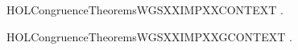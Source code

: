 \newcommand{\HOLCongruenceTheoremsWGSXXcases}{\UseVerbatim{HOLCongruenceTheoremsWGSXXcases}}
\begin{SaveVerbatim}{HOLCongruenceTheoremsWGSXXIMPXXCONTEXT}
\HOLTokenTurnstile{} \HOLSymConst{\HOLTokenForall{}}.   \HOLSymConst{\HOLTokenImp{}}  
\end{SaveVerbatim}
\newcommand{\HOLCongruenceTheoremsWGSXXIMPXXCONTEXT}{\UseVerbatim{HOLCongruenceTheoremsWGSXXIMPXXCONTEXT}}
\begin{SaveVerbatim}{HOLCongruenceTheoremsWGSXXIMPXXGCONTEXT}
\HOLTokenTurnstile{} \HOLSymConst{\HOLTokenForall{}}.   \HOLSymConst{\HOLTokenImp{}}  
\end{SaveVerbatim}
\newcommand{\HOLCongruenceTheoremsWGSXXIMPXXGCONTEXT}{\UseVerbatim{HOLCongruenceTheoremsWGSXXIMPXXGCONTEXT}}
